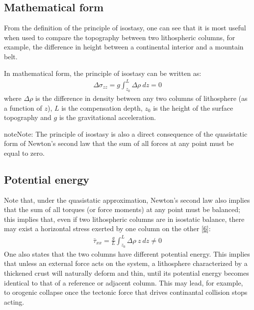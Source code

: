 \documentclass[letterpaper,10pt,english]{jupyterBook}
\begin{document}
\subsection{Mathematical form}
\label{\detokenize{isostasy:mathematical-form}}
\sphinxAtStartPar
From the definition of the principle of isostasy, one can see that it is most useful when used to compare the topography between two lithospheric columns, for example, the difference in height between a continental interior and a mountain belt.

\sphinxAtStartPar
In mathematical form, the principle of isostasy can be written as:
\begin{equation*}
\begin{split}\Delta \sigma_{zz}=g\int_{z_0}^L\Delta\rho\ dz=0\end{split}
\end{equation*}
\sphinxAtStartPar
where \(\Delta\rho\) is the difference in density between any two columns of lithosphere (as a function of \(z\)), \(L\) is the compensation depth, \(z_0\) is the height of the surface topography and \(g\) is the gravitational acceleration.

\begin{sphinxadmonition}{note}{Note:}
\sphinxAtStartPar
The principle of isostasy is also a direct consequence of the quasi\sphinxhyphen{}static form of Newton’s second law that the sum of all forces at any point must be equal to zero.
\end{sphinxadmonition}


\subsection{Potential energy}
\label{\detokenize{isostasy:potential-energy}}
\sphinxAtStartPar
Note that, under the quasi\sphinxhyphen{}static approximation, Newton’s second law also implies that the sum of all torques (or force moments) at any point must be balanced; this implies that, even if two lithospheric columns are in isostatic balance, there may exist a horizontal stress exerted by one column on the other {[}\hyperlink{cite.references:id9}{6}{]}:
\begin{equation*}
\begin{split}\bar\tau_{xx}=\frac{g}{L}\int_{z_0}^L\Delta\rho\ z\ dz\ne 0\end{split}
\end{equation*}
\sphinxAtStartPar
One also states that the two columns have different potential energy. This implies that unless an external force acts on the system, a lithosphere characterized by a thickened crust will naturally deform and thin, until its potential energy becomes identical to that of a reference or adjacent column. This may lead, for example, to orogenic collapse once the tectonic force that drives continantal collision stops acting.
\end{document}
